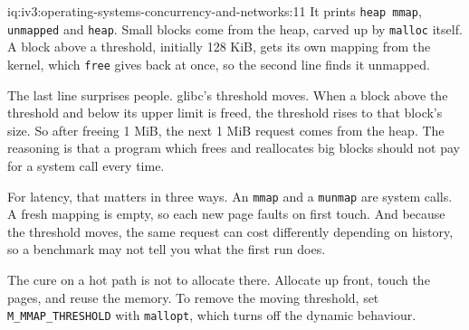 \begin{solution}{iq:iv3:operating-systems-concurrency-and-networks:11}
It prints \texttt{heap mmap}, \texttt{unmapped} and \texttt{heap}. Small blocks come from the heap, carved up by \texttt{malloc} itself. A block above a threshold, initially 128 KiB, gets its own mapping from the kernel, which \texttt{free} gives back at once, so the second line finds it unmapped.

The last line surprises people. glibc's threshold moves. When a block above the threshold and below its upper limit is freed, the threshold rises to that block's size. So after freeing 1 MiB, the next 1 MiB request comes from the heap. The reasoning is that a program which frees and reallocates big blocks should not pay for a system call every time.

For latency, that matters in three ways. An \texttt{mmap} and a \texttt{munmap} are system calls. A fresh mapping is empty, so each new page faults on first touch. And because the threshold moves, the same request can cost differently depending on history, so a benchmark may not tell you what the first run does.

The cure on a hot path is not to allocate there. Allocate up front, touch the pages, and reuse the memory. To remove the moving threshold, set \texttt{M\_MMAP\_THRESHOLD} with \texttt{mallopt}, which turns off the dynamic behaviour.

\end{solution}

